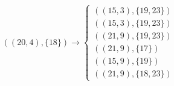 \begin{minipage}{5.0cm}
\vspace{-2.8cm}


%
\small \[((20,4),\{18\}) \rightarrow \begin{cases}
((15,3),\{19,23\}) \\
((15,3),\{19,23\}) \\
((21,9),\{19,23\}) \\
((21,9),\{17\})\\
((15,9),\{19\}) \\
((21,9),\{18,23\}) 
\end{cases}\]
%
\end{minipage}
